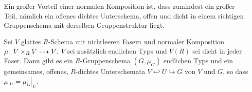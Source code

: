 Ein großer Vorteil einer normalen Komposition ist, dass zumindest
ein großer Teil, nämlich ein offenes dichtes Unterschema, offen und
dicht in einem richtigen Gruppenschema mit derselben Gruppenstruktur
liegt.
\begin{Satz}\label{thm:weil}
  Sei $V$ glattes $R$-Schema mit nichtleeren Fasern
  und normaler Komposition $\mu\colon V\times_R V\dashrightarrow V$.
  $V$ sei zusätzlich endlichen Typs und $V(R)$ sei dicht in jeder
  Faser. 
  Dann gibt es ein $R$-Gruppenschema $(G,\mu_G)$ endlichen Typs und
  ein gemeinsames, offenes, $R$-dichtes Unterschemata $V\hookleftarrow
  U\hookrightarrow G$ von $V$ und $G$, so dass $\mu|_U=\mu_G|_U$.
\end{Satz}

